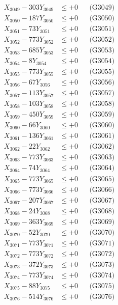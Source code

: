 \documentclass[a4paper,10pt]{article}
\begin{document}
{\begin{align}
X_{3049} - 303Y_{3049} &\leq +0 && \text{(G3049)} \\
X_{3050} - 187Y_{3050} &\leq +0 && \text{(G3050)} \\
\allowbreak
X_{3051} - 73Y_{3051} &\leq +0 && \text{(G3051)} \\
X_{3052} - 773Y_{3052} &\leq +0 && \text{(G3052)} \\
X_{3053} - 685Y_{3053} &\leq +0 && \text{(G3053)} \\
X_{3054} - 8Y_{3054} &\leq +0 && \text{(G3054)} \\
X_{3055} - 773Y_{3055} &\leq +0 && \text{(G3055)} \\
X_{3056} - 67Y_{3056} &\leq +0 && \text{(G3056)} \\
X_{3057} - 113Y_{3057} &\leq +0 && \text{(G3057)} \\
X_{3058} - 103Y_{3058} &\leq +0 && \text{(G3058)} \\
X_{3059} - 450Y_{3059} &\leq +0 && \text{(G3059)} \\
X_{3060} - 66Y_{3060} &\leq +0 && \text{(G3060)} \\
\allowbreak
X_{3061} - 136Y_{3061} &\leq +0 && \text{(G3061)} \\
X_{3062} - 22Y_{3062} &\leq +0 && \text{(G3062)} \\
X_{3063} - 773Y_{3063} &\leq +0 && \text{(G3063)} \\
X_{3064} - 74Y_{3064} &\leq +0 && \text{(G3064)} \\
X_{3065} - 773Y_{3065} &\leq +0 && \text{(G3065)} \\
X_{3066} - 773Y_{3066} &\leq +0 && \text{(G3066)} \\
X_{3067} - 207Y_{3067} &\leq +0 && \text{(G3067)} \\
X_{3068} - 24Y_{3068} &\leq +0 && \text{(G3068)} \\
X_{3069} - 363Y_{3069} &\leq +0 && \text{(G3069)} \\
X_{3070} - 52Y_{3070} &\leq +0 && \text{(G3070)} \\
\allowbreak
X_{3071} - 773Y_{3071} &\leq +0 && \text{(G3071)} \\
X_{3072} - 773Y_{3072} &\leq +0 && \text{(G3072)} \\
X_{3073} - 372Y_{3073} &\leq +0 && \text{(G3073)} \\
X_{3074} - 773Y_{3074} &\leq +0 && \text{(G3074)} \\
X_{3075} - 88Y_{3075} &\leq +0 && \text{(G3075)} \\
X_{3076} - 514Y_{3076} &\leq +0 && \text{(G3076)} \\

\end{align}}
\end{document}
